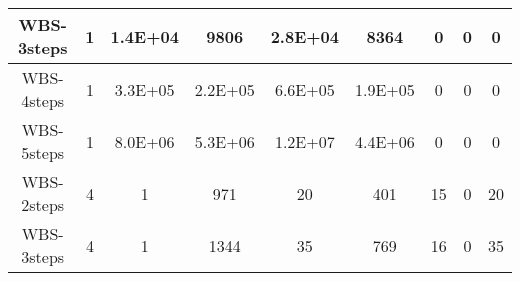 \begin{table*}[]
\begin{tabular}{@{}ccccccccc@{}}
        WBS-3steps                                                  & 1                                                            & 1.4E+04                                                    & 9806                                                        & 2.8E+04                                                        & 8364                                                           & 0                                                          & 0                                                             & 0        \\ \midrule
        WBS-4steps                                                  & 1                                                            & 3.3E+05                                                    & 2.2E+05                                                     & 6.6E+05                                                        & 1.9E+05                                                        & 0                                                          & 0                                                             & 0        \\ \midrule
        WBS-5steps                                                  & 1                                                            & 8.0E+06                                                    & 5.3E+06                                                     & 1.2E+07                                                        & 4.4E+06                                                        & 0                                                          & 0                                                             & 0        \\ \midrule
        WBS-2steps                                                  & 4                                                            & 1                                                          & 971                                                         & 20                                                             & 401                                                            & 15                                                         & 0                                                             & 20       \\ \midrule
        WBS-3steps                                                  & 4                                                            & 1                                                          & 1344                                                        & 35                                                             & 769                                                            & 16                                                         & 0                                                             & 35       \\ \midrule

\end{tabular}
\end{table*}
